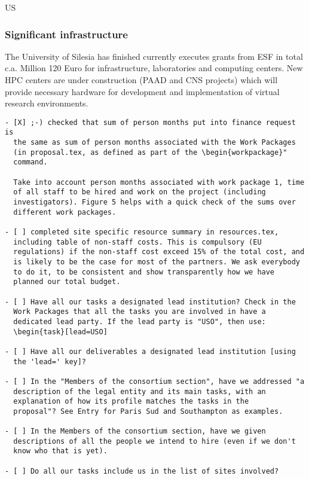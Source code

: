 \begin{sitedescription}{US}
\subsubsection*{Significant infrastructure}

The University of Silesia has finished currently executes grants from
ESF in total c.a. Million 120 Euro for infrastructure, laboratories and
computing centers. New HPC centers are under construction (PAAD and
CNS projects) which will provide necessary hardware for development
and implementation of virtual research environments.
\end{sitedescription}





\begin{draft}
\vspace{1cm}

\begin{verbatim}
- [X] ;-) checked that sum of person months put into finance request is
  the same as sum of person months associated with the Work Packages
  (in proposal.tex, as defined as part of the \begin{workpackage}"
  command.
  
  Take into account person months associated with work package 1, time
  of all staff to be hired and work on the project (including
  investigators). Figure 5 helps with a quick check of the sums over
  different work packages.

- [ ] completed site specific resource summary in resources.tex,
  including table of non-staff costs. This is compulsory (EU
  regulations) if the non-staff cost exceed 15% of the total cost, and
  is likely to be the case for most of the partners. We ask everybody
  to do it, to be consistent and show transparently how we have
  planned our total budget.

- [ ] Have all our tasks a designated lead institution? Check in the
  Work Packages that all the tasks you are involved in have a
  dedicated lead party. If the lead party is "USO", then use:
  \begin{task}[lead=USO]

- [ ] Have all our deliverables a designated lead institution [using
  the 'lead=' key]?

- [ ] In the "Members of the consortium section", have we addressed "a
  description of the legal entity and its main tasks, with an
  explanation of how its profile matches the tasks in the
  proposal"? See Entry for Paris Sud and Southampton as examples.

- [ ] In the Members of the consortium section, have we given
  descriptions of all the people we intend to hire (even if we don't
  know who that is yet). 
  
- [ ] Do all our tasks include us in the list of sites involved?
\end{verbatim}
\end{draft}




